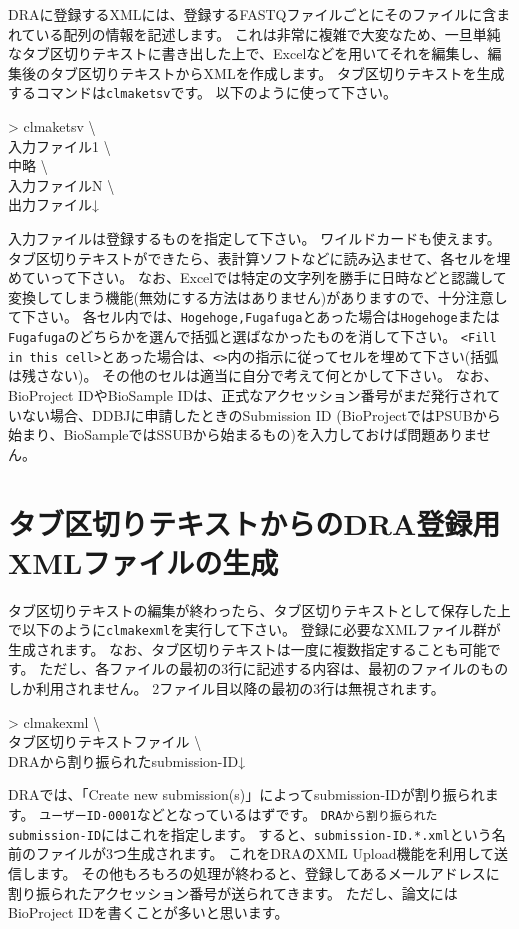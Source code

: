 \documentclass[titlepage,10pt,a4paper]{jsbook}
\newenvironment{cmd}{\begin{oframed}\raggedright\ttfamily\footnotesize\setlength{\baselineskip}{1.4em}}{\end{oframed}\vspace{-1em}}
\begin{document}
DRAに登録するXMLには、登録するFASTQファイルごとにそのファイルに含まれている配列の情報を記述します。
これは非常に複雑で大変なため、一旦単純なタブ区切りテキストに書き出した上で、Excelなどを用いてそれを編集し、編集後のタブ区切りテキストからXMLを作成します。
タブ区切りテキストを生成するコマンドは\texttt{clmaketsv}です。
以下のように使って下さい。
\begin{cmd}
{\textgreater} clmaketsv {\textbackslash}\\
入力ファイル1 {\textbackslash}\\
中略 {\textbackslash}\\
入力ファイルN {\textbackslash}\\
出力ファイル↓
\end{cmd}
入力ファイルは登録するものを指定して下さい。
ワイルドカードも使えます。
タブ区切りテキストができたら、表計算ソフトなどに読み込ませて、各セルを埋めていって下さい。
なお、Excelでは特定の文字列を勝手に日時などと認識して変換してしまう機能(無効にする方法はありません)がありますので、十分注意して下さい。
各セル内では、\texttt{{\lbrack}Hogehoge,Fugafuga{\rbrack}}とあった場合は\texttt{Hogehoge}または\texttt{Fugafuga}のどちらかを選んで括弧と選ばなかったものを消して下さい。
\texttt{{\textless}Fill in this cell{\textgreater}}とあった場合は、\texttt{{\textless}{\textgreater}}内の指示に従ってセルを埋めて下さい(括弧は残さない)。
その他のセルは適当に自分で考えて何とかして下さい。
なお、BioProject IDやBioSample IDは、正式なアクセッション番号がまだ発行されていない場合、DDBJに申請したときのSubmission ID (BioProjectではPSUBから始まり、BioSampleではSSUBから始まるもの)を入力しておけば問題ありません。

\section{タブ区切りテキストからのDRA登録用XMLファイルの生成}

タブ区切りテキストの編集が終わったら、タブ区切りテキストとして保存した上で以下のように\texttt{clmakexml}を実行して下さい。
登録に必要なXMLファイル群が生成されます。
なお、タブ区切りテキストは一度に複数指定することも可能です。
ただし、各ファイルの最初の3行に記述する内容は、最初のファイルのものしか利用されません。
2ファイル目以降の最初の3行は無視されます。
\begin{cmd}
{\textgreater} clmakexml {\textbackslash}\\
タブ区切りテキストファイル {\textbackslash}\\
DRAから割り振られたsubmission-ID↓
\end{cmd}
DRAでは、「Create new submission(s)」によってsubmission-IDが割り振られます。
\texttt{ユーザーID-0001}などとなっているはずです。
\texttt{DRAから割り振られたsubmission-ID}にはこれを指定します。
すると、\texttt{submission-ID.*.xml}という名前のファイルが3つ生成されます。
これをDRAのXML Upload機能を利用して送信します。
その他もろもろの処理が終わると、登録してあるメールアドレスに割り振られたアクセッション番号が送られてきます。
ただし、論文にはBioProject IDを書くことが多いと思います。
\end{document}
